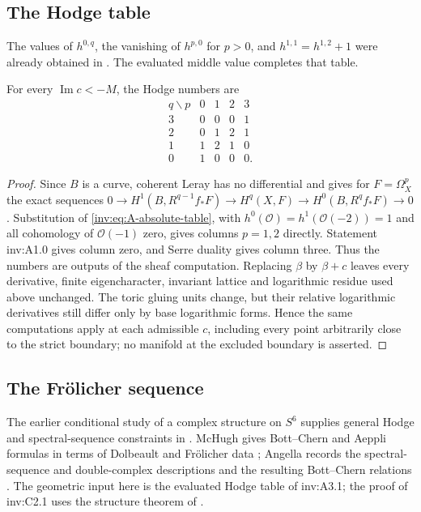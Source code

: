 \subsection{The Hodge table}\label{sec:hodge}

The values of $h^{0,q}$, the vanishing of $h^{p,0}$ for $p>0$, and $h^{1,1}=h^{1,2}+1$ were already obtained in \cite[Theorem 9.1 and Remark 1.3]{AC26}. The evaluated middle value completes that table.

\begin{theorem}\label{inv:A3.1}
For every $\operatorname{Im}c<-M$, the Hodge numbers are
\[
\begin{array}{c|rrrr}
q\backslash p&0&1&2&3\\\hline
3&0&0&0&1\\
2&0&1&2&1\\
1&1&2&1&0\\
0&1&0&0&0.
\end{array}
\]
\end{theorem}

\begin{proof}
Since $B$ is a curve, coherent Leray has no differential and gives
for $F=\Omega_X^p$ the exact sequences
$0\to H^1(B,R^{q-1}f_*F)\to H^q(X,F)\to H^0(B,R^qf_*F)\to0$.
Substitution of \eqref{inv:eq:A-absolute-table}, with
$h^0(\mathcal O)=h^1(\mathcal O(-2))=1$ and all cohomology of $\mathcal O(-1)$ zero,
gives columns $p=1,2$ directly.  Statement inv:A1.0 gives column zero,
and Serre duality gives column three.  Thus the numbers are outputs
of the sheaf computation.  Replacing $\beta$ by $\beta+c$ leaves
every derivative, finite eigencharacter, invariant lattice and
logarithmic residue used above unchanged.  The toric gluing units
change, but their relative logarithmic derivatives still differ only
by base logarithmic forms.  Hence the same computations apply at
each admissible $c$, including every point arbitrarily close to the
strict boundary; no manifold at the excluded boundary is asserted.
\end{proof}

\subsection{The Fr\"olicher sequence}\label{sec:frolicher}

The earlier conditional study of a complex structure on $S^6$ supplies
general Hodge and spectral-sequence constraints in
\cite[Proposition 3.1, Theorem 3.2 and Corollary 3.3]{Ugarte00}.
McHugh gives Bott--Chern and Aeppli formulas in terms of Dolbeault and
Fr\"olicher data \cite[Section 7.1, pp.~24--25]{McHugh18}; Angella records
the spectral-sequence and double-complex descriptions and the resulting
Bott--Chern relations \cite[Figures 1--2 and Section 4]{Angella17}.
The geometric input here is the evaluated Hodge table of inv:A3.1;
the proof of inv:C2.1 uses the structure theorem of \cite{Stelzig21}.

